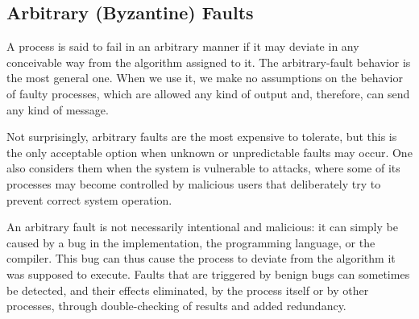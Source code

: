 \documentclass{book}
\begin{document}
\subsection{Arbitrary (Byzantine) Faults}
A process is said to fail in an arbitrary manner if it may deviate in any conceivable way from the algorithm assigned to it.
The arbitrary-fault behavior is the most general one. When we use it, we make no assumptions on the behavior of faulty processes, which are allowed any kind of output and, therefore, can send any kind of message.

Not surprisingly, arbitrary faults are the most expensive to tolerate, but this is the only acceptable option when unknown or unpredictable faults may occur.
One also considers them when the system is vulnerable to attacks, where some of its processes may become controlled by malicious users that deliberately try to prevent correct system operation.

An arbitrary fault is not necessarily intentional and malicious: it can simply be caused by a bug in the implementation, the programming language, or the compiler.
This bug can thus cause the process to deviate from the algorithm it was supposed to execute.
Faults that are triggered by benign bugs can sometimes be detected, and their effects eliminated, by the process itself or by other processes, through double-checking of results and added redundancy.
\end{document}
